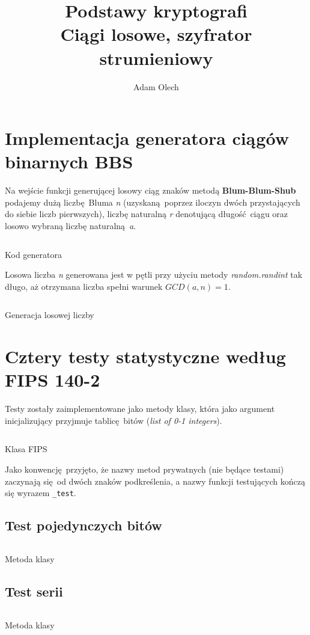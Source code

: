 \documentclass[12pt]{article}
\title{Podstawy kryptografi \\ \large Ciągi losowe, szyfrator strumieniowy}
\author{Adam Olech}
\begin{document}
\maketitle

\section{Implementacja generatora ciągów binarnych BBS}

Na wejście funkcji generującej losowy ciąg znaków metodą \textbf{Blum-Blum-Shub}
podajemy dużą liczbę Bluma \textit{n} 
(uzyskaną poprzez iloczyn dwóch przystających do siebie liczb pierwszych),
liczbę naturalną \textit{r} denotującą długość ciągu
oraz losowo wybraną liczbę naturalną \textit{a}.

\begin{listing}[H]
	\inputminted[firstline=21,lastline=32]{python}{../bbs_generator.py}
	\caption{Kod generatora}
\end{listing}

Losowa liczba \textit{n} generowana jest w pętli przy użyciu metody \textit{random.randint}
tak długo, aż otrzymana liczba spełni warunek $GCD(a,n) = 1$.

\begin{listing}[H]
	\inputminted[firstline=14,lastline=19]{python}{../bbs_generator.py}
	\caption{Generacja losowej liczby}
\end{listing}

\section{Cztery testy statystyczne według FIPS 140-2}

Testy zostały zaimplementowane jako metody klasy, która jako argument inicjalizujący przyjmuje
tablicę bitów (\textit{list of 0-1 integers}).

\begin{listing}[H]
	\inputminted[firstline=4,lastline=9]{python}{../fips.py}
	\caption{Klasa FIPS}
\end{listing}

Jako konwencję przyjęto, że nazwy metod prywatnych (nie będące testami) zaczynają się od dwóch znaków podkreślenia,
a nazwy funkcji testujących kończą się wyrazem \lstinline{_test}.

\subsection{Test pojedynczych bitów}

\begin{listing}[H]
	\inputminted[firstline=34,lastline=37]{python}{../fips.py}
	\caption{Metoda klasy}
\end{listing}

\subsection{Test serii}

\begin{listing}[H]
	\inputminted[firstline=39,lastline=56]{python}{../fips.py}
	\caption{Metoda klasy}
\end{listing}
\end{document}
